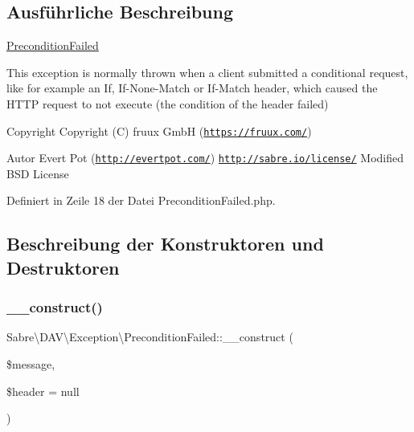 \subsection{Ausführliche Beschreibung}
\mbox{\hyperlink{class_sabre_1_1_d_a_v_1_1_exception_1_1_precondition_failed}{Precondition\+Failed}}

This exception is normally thrown when a client submitted a conditional request, like for example an If, If-\/\+None-\/\+Match or If-\/\+Match header, which caused the H\+T\+TP request to not execute (the condition of the header failed)

\begin{DoxyCopyright}{Copyright}
Copyright (C) fruux GmbH (\href{https://fruux.com/}{\tt https\+://fruux.\+com/}) 
\end{DoxyCopyright}
\begin{DoxyAuthor}{Autor}
Evert Pot (\href{http://evertpot.com/}{\tt http\+://evertpot.\+com/})  \href{http://sabre.io/license/}{\tt http\+://sabre.\+io/license/} Modified B\+SD License 
\end{DoxyAuthor}


Definiert in Zeile 18 der Datei Precondition\+Failed.\+php.



\subsection{Beschreibung der Konstruktoren und Destruktoren}
\mbox{\label{class_sabre_1_1_d_a_v_1_1_exception_1_1_precondition_failed_a38dd5ca25a054e91ba4588f81f8fee56}} 
\subsubsection{\texorpdfstring{\+\_\+\+\_\+construct()}{\_\_construct()}}
{\footnotesize\ttfamily Sabre\textbackslash{}\+D\+A\+V\textbackslash{}\+Exception\textbackslash{}\+Precondition\+Failed\+::\+\_\+\+\_\+construct (\begin{DoxyParamCaption}\item[{}]{\$message,  }\item[{}]{\$header = {\ttfamily null} }\end{DoxyParamCaption})}

